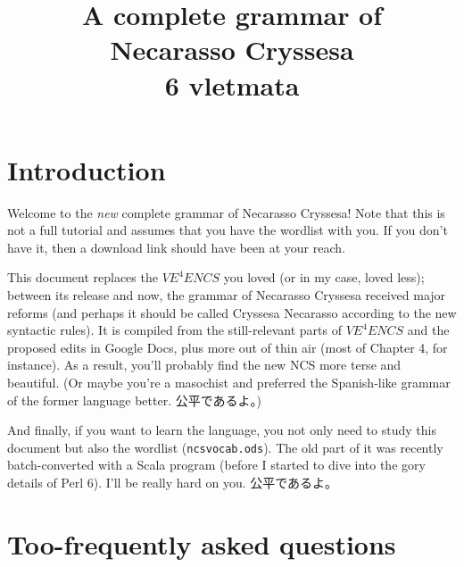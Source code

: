 \documentclass{book}
\title{\textsf{A complete grammar of \\ Necarasso Cryssesa \\ 6 vletmata}}
\begin{document}
\maketitle

\tableofcontents

\section{Introduction}

Welcome to the \emph{new} complete grammar of Necarasso Cryssesa! Note that this is not a full tutorial and assumes that you have the wordlist with you. If you don't have it, then a download link should have been at your reach.

This document replaces the $VE^4ENCS$ you loved (or in my case, loved less); between its release and now, the grammar of Necarasso Cryssesa received major reforms (and perhaps it should be called Cryssesa Necarasso according to the new syntactic rules). It is compiled from the still-relevant parts of $VE^4ENCS$ and the proposed edits in Google Docs, plus more out of thin air (most of Chapter 4, for instance). As a result, you'll probably find the new NCS more terse and beautiful. (Or maybe you're a masochist and preferred the Spanish-like grammar of the former language better. \textsf{公平であるよ。})

And finally, if you want to learn the language, you not only need to study this document but also the wordlist (\texttt{ncsvocab.ods}). The old part of it was recently batch-converted with a Scala program (before I started to dive into the gory details of Perl 6). I'll be really hard on you. \textsf{公平であるよ。}

\section{Too-frequently asked questions}
\end{document}
